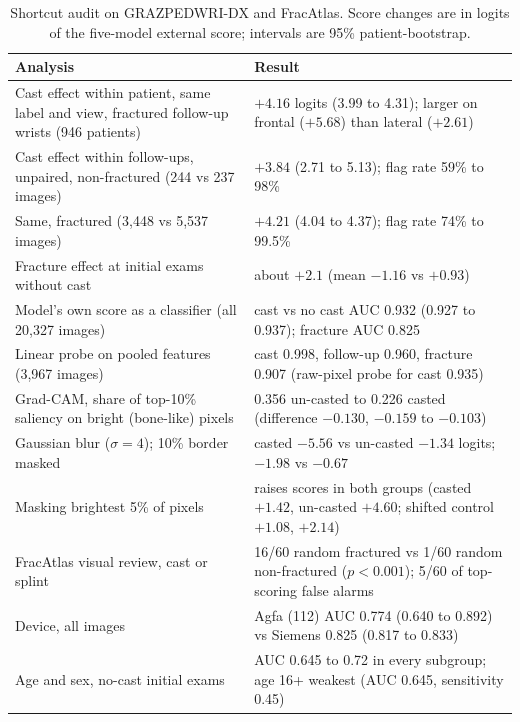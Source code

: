 \documentclass[11pt]{article}
\begin{document}
\begin{table}[h]\centering\small
\begin{tabular}{p{}p{}}\toprule
Analysis & Result\\\midrule
Cast effect within patient, same label and view, fractured follow-up wrists (946 patients) & $+4.16$ logits (3.99 to 4.31); larger on frontal ($+5.68$) than lateral ($+2.61$)\\
Cast effect within follow-ups, unpaired, non-fractured (244 vs 237 images) & $+3.84$ (2.71 to 5.13); flag rate 59\% to 98\%\\
Same, fractured (3,448 vs 5,537 images) & $+4.21$ (4.04 to 4.37); flag rate 74\% to 99.5\%\\
Fracture effect at initial exams without cast & about $+2.1$ (mean $-1.16$ vs $+0.93$)\\
Model's own score as a classifier (all 20,327 images) & cast vs no cast AUC 0.932 (0.927 to 0.937); fracture AUC 0.825\\
Linear probe on pooled features (3,967 images) & cast 0.998, follow-up 0.960, fracture 0.907 (raw-pixel probe for cast 0.935)\\
Grad-CAM, share of top-10\% saliency on bright (bone-like) pixels & 0.356 un-casted to 0.226 casted (difference $-0.130$, $-0.159$ to $-0.103$)\\
Gaussian blur ($\sigma{=}4$); 10\% border masked & casted $-5.56$ vs un-casted $-1.34$ logits; $-1.98$ vs $-0.67$\\
Masking brightest 5\% of pixels & raises scores in both groups (casted $+1.42$, un-casted $+4.60$; shifted control $+1.08$, $+2.14$)\\
FracAtlas visual review, cast or splint & 16/60 random fractured vs 1/60 random non-fractured ($p<0.001$); 5/60 of top-scoring false alarms\\
Device, all images & Agfa (112) AUC 0.774 (0.640 to 0.892) vs Siemens 0.825 (0.817 to 0.833)\\
Age and sex, no-cast initial exams & AUC 0.645 to 0.72 in every subgroup; age 16+ weakest (AUC 0.645, sensitivity 0.45)\\\bottomrule
\end{tabular}
\caption{Shortcut audit on GRAZPEDWRI-DX and FracAtlas. Score changes are in logits of the five-model external score; intervals are 95\% patient-bootstrap.}\label{tab:shortcut}
\end{table}
\end{document}
